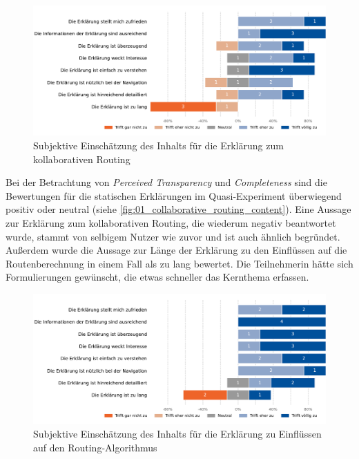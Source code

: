 \begin{figure}[htb!]
    \centering
    \includegraphics[width=\textwidth]{contents/06_model_evaluation/02_evaluation/res/qualitativeFeedback-01_collaborative_routing_content.pdf}
    \caption{Subjektive Einschätzung des Inhalts für die Erklärung zum kollaborativen Routing}
    \label{fig:01_collaborative_routing_content}
\end{figure}

Bei der Betrachtung von \textit{Perceived Transparency} und \textit{Completeness} sind die Bewertungen für die statischen Erklärungen im Quasi-Experiment überwiegend positiv oder neutral (siehe \autoref{fig:01_collaborative_routing_content}). Eine Aussage zur Erklärung zum kollaborativen Routing, die wiederum negativ beantwortet wurde, stammt von selbigem Nutzer wie zuvor und ist auch ähnlich begründet. Außerdem wurde die Aussage zur Länge der Erklärung zu den Einflüssen auf die Routenberechnung in einem Fall als zu lang bewertet. Die Teilnehmerin hätte sich Formulierungen gewünscht, die etwas schneller das Kernthema erfassen.

\begin{figure}[htb!]
    \centering
    \includegraphics[width=\textwidth]{contents/06_model_evaluation/02_evaluation/res/qualitativeFeedback-02_collaborative_algorithm_content.pdf}
    \caption{Subjektive Einschätzung des Inhalts für die Erklärung zu Einflüssen auf den Routing-Algorithmus}
    \label{fig:02_collaborative_algorithm_content}
\end{figure}

